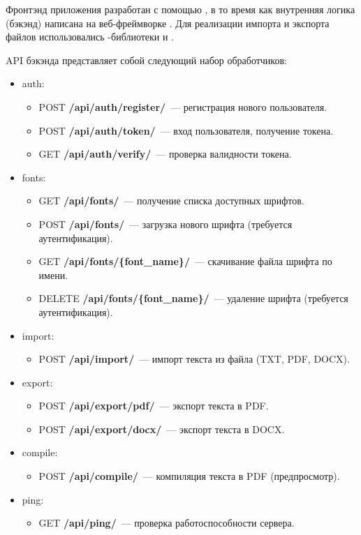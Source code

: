     Фронтэнд приложения разработан с помощью \vuejs{}, в то время как внутренняя логика (бэкэнд) написана на \python{} веб-фреймворке \fastapi{}. Для реализации импорта и экспорта файлов использовались \python{}-библиотеки \docx{} и \pypdf{}.

    API бэкэнда представляет собой следующий набор обработчиков:
    \begin{itemize}
        \item auth:
        \begin{itemize}
            \item POST \textbf{/api/auth/register/}~--- регистрация нового пользователя.
            \item POST \textbf{/api/auth/token/}~--- вход пользователя, получение токена.
            \item GET \textbf{/api/auth/verify/}~--- проверка валидности токена.
        \end{itemize}

        \item fonts:
        \begin{itemize}
            \item GET \textbf{/api/fonts/}~--- получение списка доступных шрифтов.
            \item POST \textbf{/api/fonts/}~--- загрузка нового шрифта (требуется аутентификация).
            \item GET \textbf{/api/fonts/\{font\_name\}/}~--- скачивание файла шрифта по имени.
            \item DELETE \textbf{/api/fonts/\{font\_name\}/}~--- удаление шрифта (требуется аутентификация).
        \end{itemize}

        \item import:
        \begin{itemize}
            \item POST \textbf{/api/import/}~--- импорт текста из файла (TXT, PDF, DOCX).
        \end{itemize}

        \item export:
        \begin{itemize}
            \item POST \textbf{/api/export/pdf/}~--- экспорт текста в PDF.
        \item POST \textbf{/api/export/docx/}~--- экспорт текста в DOCX.
        \end{itemize}

        \item compile:
        \begin{itemize}
            \item POST \textbf{/api/compile/}~--- компиляция текста в PDF (предпросмотр).
        \end{itemize}

        \item ping:
        \begin{itemize}
            \item GET \textbf{/api/ping/}~--- проверка работоспособности сервера.
        \end{itemize}
    \end{itemize}


